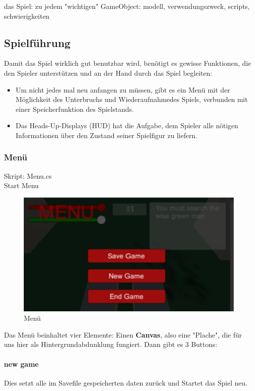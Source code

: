 das Spiel: 
	zu jedem "wichtigen" GameObject:
	modell, verwendungszweck, scripts, 				schwierigkeiten

\subsection{Spielführung}
Damit das Spiel wirklich gut benutzbar wird, benötigt es gewisse Funktionen, die den Spieler unterstützen und an der Hand durch das Spiel begleiten:
\begin{itemize}
\item Um nicht jedes mal neu anfangen zu müssen, gibt es ein Menü mit der Möglichkeit des Unterbruchs und Wiederaufnahmedes Spiels, verbunden mit einer Speicherfunktion des Spielstands.
\item Das Heads-Up-Displays (HUD) hat die Aufgabe, dem Spieler alle nötigen Informationen über den Zustand seiner Spielfigur zu liefern.
\end{itemize}



\subsubsection{Menü}
Skript: Menu.cs\\
Start Menu

\begin{figure}[H]
\includegraphics[scale=1]{screenshots/menuscreen.png}
\caption{Menü}
\end{figure}

Das Menü beinhaltet vier Elemente: Einen \textbf{Canvas}, also eine "Plache", die für uns hier als Hintergrundabdunklung fungiert.
Dann gibt es 3 Buttons:
\paragraph{new game}
Dies setzt alle im Savefile gespeicherten daten zurück und Startet das Spiel neu.

